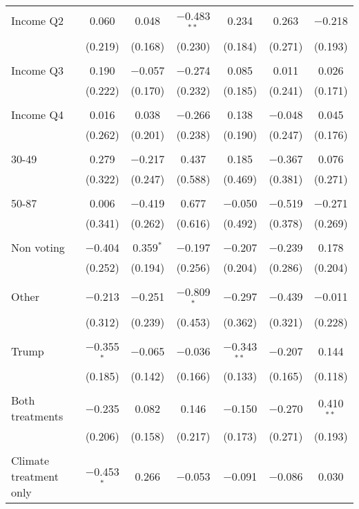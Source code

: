\begin{tabular}{@{\extracolsep{5pt}}lcccccc}
 Income Q2 & 0.060 & 0.048 & $-$0.483$^{**}$ & 0.234 & 0.263 & $-$0.218 \\ 
  & (0.219) & (0.168) & (0.230) & (0.184) & (0.271) & (0.193) \\ 
  & & & & & & \\ 
 Income Q3 & 0.190 & $-$0.057 & $-$0.274 & 0.085 & 0.011 & 0.026 \\ 
  & (0.222) & (0.170) & (0.232) & (0.185) & (0.241) & (0.171) \\ 
  & & & & & & \\ 
 Income Q4 & 0.016 & 0.038 & $-$0.266 & 0.138 & $-$0.048 & 0.045 \\ 
  & (0.262) & (0.201) & (0.238) & (0.190) & (0.247) & (0.176) \\ 
  & & & & & & \\ 
 30-49 & 0.279 & $-$0.217 & 0.437 & 0.185 & $-$0.367 & 0.076 \\ 
  & (0.322) & (0.247) & (0.588) & (0.469) & (0.381) & (0.271) \\ 
  & & & & & & \\ 
 50-87 & 0.006 & $-$0.419 & 0.677 & $-$0.050 & $-$0.519 & $-$0.271 \\ 
  & (0.341) & (0.262) & (0.616) & (0.492) & (0.378) & (0.269) \\ 
  & & & & & & \\ 
 Non voting & $-$0.404 & 0.359$^{*}$ & $-$0.197 & $-$0.207 & $-$0.239 & 0.178 \\ 
  & (0.252) & (0.194) & (0.256) & (0.204) & (0.286) & (0.204) \\ 
  & & & & & & \\ 
 Other & $-$0.213 & $-$0.251 & $-$0.809$^{*}$ & $-$0.297 & $-$0.439 & $-$0.011 \\ 
  & (0.312) & (0.239) & (0.453) & (0.362) & (0.321) & (0.228) \\ 
  & & & & & & \\ 
 Trump & $-$0.355$^{*}$ & $-$0.065 & $-$0.036 & $-$0.343$^{**}$ & $-$0.207 & 0.144 \\ 
  & (0.185) & (0.142) & (0.166) & (0.133) & (0.165) & (0.118) \\ 
  & & & & & & \\ 
 Both treatments & $-$0.235 & 0.082 & 0.146 & $-$0.150 & $-$0.270 & 0.410$^{**}$ \\ 
  & (0.206) & (0.158) & (0.217) & (0.173) & (0.271) & (0.193) \\ 
  & & & & & & \\ 
 Climate treatment only & $-$0.453$^{*}$ & 0.266 & $-$0.053 & $-$0.091 & $-$0.086 & 0.030 \\ 

\end{tabular}
